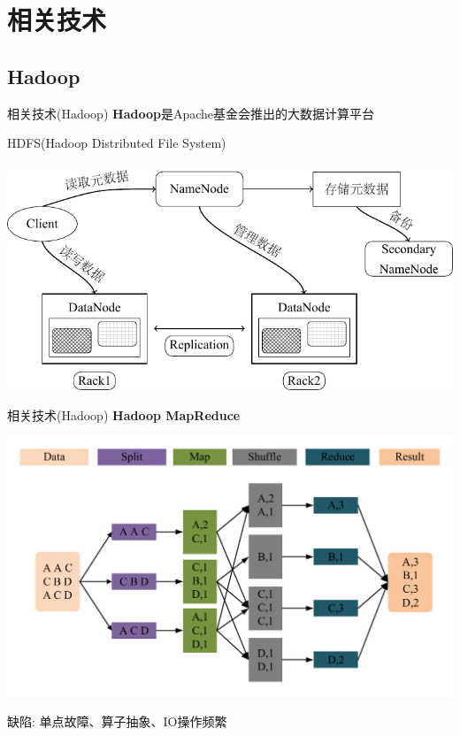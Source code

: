 \section{相关技术}

\subsection{Hadoop}

\begin{frame}[t]{相关技术(Hadoop)}
    \textbf{Hadoop}是Apache基金会推出的大数据计算平台
    
    \pause
    HDFS(Hadoop Distributed File System)

    \includegraphics[scale=0.8]{figures/hdfs.pdf}
\end{frame}

\begin{frame}[t]{相关技术(Hadoop)}
    \textbf{Hadoop MapReduce}

    \pause
    \includegraphics[scale=0.4]{figures/mapreduce.pdf}

    \pause
    \vspace{-1em}
    \begin{center}
    \alert{缺陷: }单点故障、算子抽象、IO操作频繁
    \end{center} 
\end{frame}

